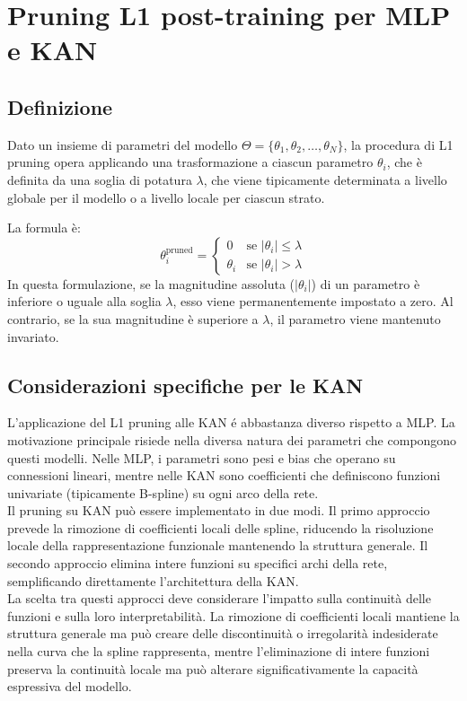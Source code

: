 \documentclass[a4paper,12pt]{report}
\begin{document}
	\section{Pruning L1 post-training per MLP e KAN}
	
	\subsection{Definizione}
	Dato un insieme di parametri del modello $\Theta = \{\theta_1, \theta_2, \dots, \theta_N\}$, la procedura di L1 pruning opera applicando una trasformazione a ciascun parametro $\theta_i$, che è definita da una soglia di potatura $\lambda$, che viene tipicamente determinata a livello globale per il modello o a livello locale per ciascun strato.
	
	La formula è:
	$$
	\theta_i^{\text{pruned}} = \begin{cases}
		0 & \text{se } |\theta_i| \le \lambda \\
		\theta_i & \text{se } |\theta_i| > \lambda
	\end{cases}
	$$
	In questa formulazione, se la magnitudine assoluta ($|\theta_i|$) di un parametro è inferiore o uguale alla soglia $\lambda$, esso viene permanentemente impostato a zero. Al contrario, se la sua magnitudine è superiore a $\lambda$, il parametro viene mantenuto invariato.
	
	\subsection{Considerazioni specifiche per le KAN}
	L'applicazione del L1 pruning alle KAN é abbastanza diverso rispetto a MLP. La motivazione principale risiede nella diversa natura dei parametri che compongono questi modelli. Nelle MLP, i parametri sono pesi e bias che operano su connessioni lineari, mentre nelle KAN sono coefficienti che definiscono funzioni univariate (tipicamente B-spline) su ogni arco della rete. \\
	Il pruning su KAN può essere implementato in due modi. Il primo approccio prevede la rimozione di coefficienti locali delle spline, riducendo la risoluzione locale della rappresentazione funzionale mantenendo la struttura generale. Il secondo approccio elimina intere funzioni su specifici archi della rete, semplificando direttamente l'architettura della KAN. \\
	La scelta tra questi approcci deve considerare l'impatto sulla continuità delle funzioni e sulla loro interpretabilità. La rimozione di coefficienti locali mantiene la struttura generale ma può creare delle discontinuità o irregolarità indesiderate nella curva che la spline rappresenta, mentre l'eliminazione di intere funzioni preserva la continuità locale ma può alterare significativamente la capacità espressiva del modello.
	
\end{document}
